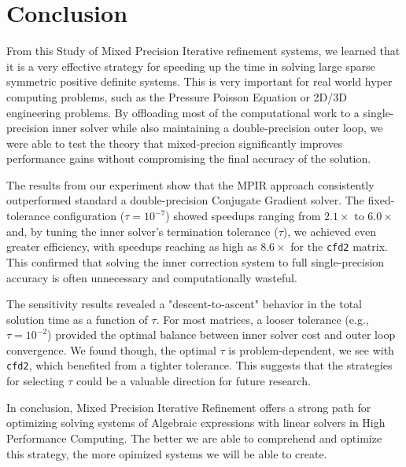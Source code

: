 \documentclass[a4paper,10.5pt,twoside]{article}
\begin{document}
\section{Conclusion}

From this Study of Mixed Precision Iterative refinement systems, we learned that it is a very effective strategy for speeding up the time in solving large sparse symmetric positive definite systems. This is very important for real world hyper computing problems, such as the Pressure Poisson Equation or 2D/3D engineering problems. By offloading most of the computational work to a single-precision inner solver while also maintaining a double-precision outer loop, we were able to test the theory that mixed-precion significantly improves performance gains without compromising the final accuracy of the solution.

The results from our experiment show that the MPIR approach consistently outperformed standard a double-precision Conjugate Gradient solver. The fixed-tolerance configuration ($\tau=10^{-7}$) showed speedups ranging from $2.1\times$ to $6.0\times$ and, by tuning the inner solver's termination tolerance ($\tau$), we achieved even greater efficiency, with speedups reaching as high as $8.6\times$ for the \texttt{cfd2} matrix. This confirmed that solving the inner correction system to full single-precision accuracy is often unnecessary and computationally wasteful.

The sensitivity results revealed a "descent-to-ascent" behavior in the total solution time as a function of $\tau$. For most matrices, a looser tolerance (e.g., $\tau=10^{-2}$) provided the optimal balance between inner solver cost and outer loop convergence. We found though, the optimal $\tau$ is problem-dependent, we see with \texttt{cfd2}, which benefited from a tighter tolerance. This suggests that the strategies for selecting $\tau$ could be a valuable direction for future research.

In conclusion, Mixed Precision Iterative Refinement offers a strong path for optimizing solving systems of Algebraic expressions with linear solvers in High Performance Computing. The better we are able to comprehend and optimize this strategy, the more opimized systems we will be able to create. 


\printbibliography
\end{document}
